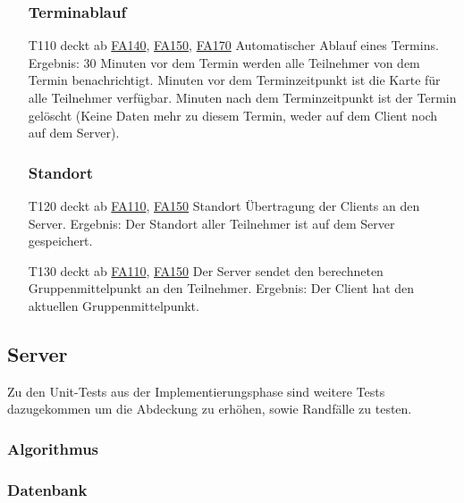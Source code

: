 \documentclass{scrartcl}
\begin{document}
\begin{itemize}
	\subsubsection{Terminablauf}
	
	\item[T110] deckt ab \hyperlink{FA140}{FA140}, \hyperlink{FA150}{FA150}, \hyperlink{FA170}{FA170} \newline
	Automatischer Ablauf eines Termins. \newline
	Ergebnis: 30 Minuten vor dem Termin werden alle Teilnehmer von dem Termin benachrichtigt.   Minuten vor dem Terminzeitpunkt ist die Karte für alle Teilnehmer verfügbar.   Minuten nach dem Terminzeitpunkt ist der Termin gelöscht (Keine Daten mehr zu diesem Termin, weder auf 					dem Client noch auf dem Server).
	
	\subsubsection{Standort}
	\item[T120] deckt ab \hyperlink{FA110}{FA110}, \hyperlink{FA150}{FA150} \newline
	Standort Übertragung der Clients an den Server.  \newline
	Ergebnis: Der Standort aller Teilnehmer ist auf dem Server gespeichert.
	
	\item[T130]  deckt ab \hyperlink{FA110}{FA110}, \hyperlink{FA150}{FA150} \newline
	Der Server sendet den berechneten Gruppenmittelpunkt an den Teilnehmer. \newline
	Ergebnis: Der Client hat den aktuellen Gruppenmittelpunkt.
	
\end{itemize}	

\subsection{Server}
Zu den Unit-Tests aus der Implementierungsphase sind weitere Tests dazugekommen um die Abdeckung zu erhöhen, sowie Randfälle zu testen.
\subsubsection{Algorithmus}
\subsubsection{Datenbank}
\end{document}
